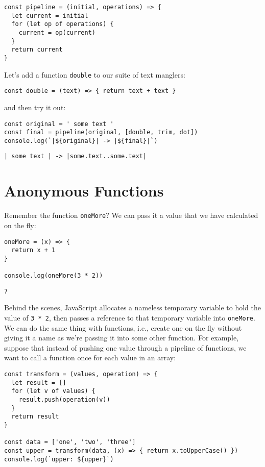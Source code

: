 \begin{verbatim}
const pipeline = (initial, operations) => {
  let current = initial
  for (let op of operations) {
    current = op(current)
  }
  return current
}
\end{verbatim}

Let's add a function \texttt{double} to our suite of text manglers:

\begin{verbatim}
const double = (text) => { return text + text }
\end{verbatim}

and then try it out:

\begin{verbatim}
const original = ' some text '
const final = pipeline(original, [double, trim, dot])
console.log(`|${original}| -> |${final}|`)
\end{verbatim}

\begin{verbatim}
| some text | -> |some.text..some.text|
\end{verbatim}

\section{Anonymous Functions}\label{s:callbacks-anonymous}

Remember the function \texttt{oneMore}?
We can pass it a value that we have calculated on the fly:

\begin{verbatim}
oneMore = (x) => {
  return x + 1
}

console.log(oneMore(3 * 2))
\end{verbatim}

\begin{verbatim}
7
\end{verbatim}

Behind the scenes,
JavaScript allocates a nameless temporary variable to hold the value of \texttt{3\ *\ 2},
then passes a reference to that temporary variable into \texttt{oneMore}.
We can do the same thing with functions,
i.e., create one on the fly without giving it a name as we're passing it into some other function.
For example,
suppose that instead of pushing one value through a pipeline of functions,
we want to call a function once for each value in an array:

\begin{verbatim}
const transform = (values, operation) => {
  let result = []
  for (let v of values) {
    result.push(operation(v))
  }
  return result
}

const data = ['one', 'two', 'three']
const upper = transform(data, (x) => { return x.toUpperCase() })
console.log(`upper: ${upper}`)
\end{verbatim}

